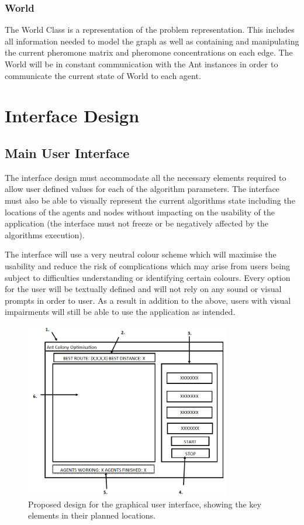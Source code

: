 \subsubsection{World}
The World Class is a representation of the problem representation. This includes all information needed to model the graph as well as containing and manipulating the current pheromone matrix and pheromone concentrations on each edge. The World will be in constant communication with the Ant instances in order to communicate the current state of World to each agent.


\section{Interface Design}
\subsection{Main User Interface}
\label{ssec:mainUI}
The interface design must accommodate all the necessary elements required to allow user defined values for each of the algorithm parameters. The interface must also be able to visually represent the current algorithms state including the locations of the agents and nodes without impacting on the usability of the application (the interface must not freeze or be negatively affected by the algorithms execution).

The interface will use a very neutral colour scheme which will maximise the usability and reduce the risk of complications which may arise from users being subject to difficulties understanding or identifying certain colours. Every option for the user will be textually defined and will not rely on any sound or visual prompts in order to user. As a result in addition to the above, users with visual impairments will still be able to use the application as intended.

\begin{figure}[H]
\centering
\includegraphics[width=0.8\textwidth]{Images/design/screen}
\caption{Proposed design for the graphical user interface, showing the key elements in their planned locations.}
\label{fig:interface}
\end{figure}

